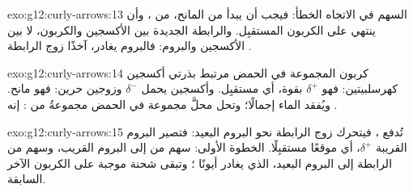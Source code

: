 \begin{solution}{exo:g12:curly-arrows:13}
السهم في الاتجاه الخطأ: فيجب أن يبدأ من المانح، 
من ، وأن ينتهي على الكربون المستقبِل. والرابطة الجديدة بين
الأكسجين والكربون، لا بين الأكسجين والبروم: فالبروم يغادر، آخذًا
زوج الرابطة .
\end{solution}

\begin{solution}{exo:g12:curly-arrows:14}
كربون المجموعة  في الحمض مرتبط بذرتي أكسجين
كهرسلبيتين: فهو $\delta^+$ بقوة، أي مستقبِل. وأكسجين
 يحمل $\delta^-$ وزوجين حرين: فهو مانح.
ويُفقد الماء إجمالًا؛ وتحل محلَّ مجموعة  في الحمض مجموعةُ
 من : إنه .
\end{solution}

\begin{solution}{exo:g12:curly-arrows:15}
تُدفع  ، فيتحرك زوج الرابطة
 نحو البروم البعيد: فتصير  البروم القريبة
$\delta^+$، أي موقعًا مستقبِلًا. الخطوة الأولى: سهم من 
إلى البروم القريب، وسهم من الرابطة  إلى البروم
البعيد، الذي يغادر أيونًا ؛ وتبقى شحنة موجبة على
الكربون الآخر  السابقة.
\end{solution}

